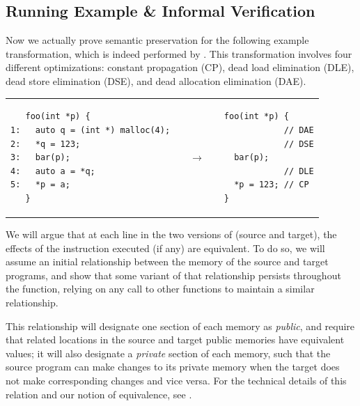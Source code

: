\subsection{Running Example \& Informal Verification}
\label{reasoning:running}

Now we actually prove semantic preservation for the following example transformation, which is
indeed performed by .  This transformation involves four different optimizations:
constant propagation (CP), dead load elimination (DLE), dead store elimination (DSE), and dead
allocation elimination (DAE).
\begin{center}
\begin{tabular}{@{}l@{}l@{}l@{}}
\begin{minipage}{0.5\textwidth}
\begin{verbatim}
   foo(int *p) {
1:   auto q = (int *) malloc(4);
2:   *q = 123;
3:   bar(p);
4:   auto a = *q;
5:   *p = a;
   }
\end{verbatim}
\end{minipage}
&
$\quad\rightarrow\quad$
&
\begin{minipage}{0.3\textwidth}
\begin{verbatim}
foo(int *p) {
            // DAE
            // DSE
  bar(p);
            // DLE
  *p = 123; // CP
}
\end{verbatim}
\end{minipage}
\end{tabular}
\end{center}

We will argue that at each line in the two versions of  (source and target), the effects
of the instruction executed (if any) are equivalent. To do so, we will assume an initial
relationship between the memory of the source and target programs, and show that some variant of
that relationship persists throughout the function, relying on any call to other functions to
maintain a similar relationship.

This relationship will designate one section of each memory as \emph{public}, and require that
related locations in the source and target public memories have equivalent values; it will also
designate a \emph{private} section of each memory, such that the source program can make changes to
its private memory when the target does not make corresponding changes and vice versa.  For the
technical details of this relation and our notion of equivalence, see .


